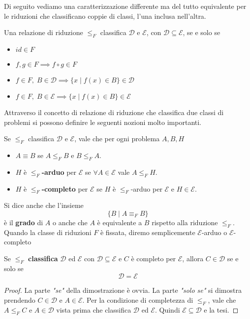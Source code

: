 Di seguito vediamo una caratterizzazione differente ma del tutto
equivalente per le riduzioni che classificano coppie di classi,
l'una inclusa nell'altra.

\begin{lemma}
	Una relazione di riduzione $\leq_F$ classifica $\mathcal{D}$
	e $\mathcal{E}$, con $\mathcal{D} \subseteq \mathcal{E}$, se
	e solo se
	\begin{itemize}
		\item $id \in F$
		\item $f, g \in F \implies f \circ g \in F$
		\item $f \in F, \; B \in \mathcal{D} \implies
			      \{ x \mid f(x) \in B \} \in \mathcal{D}$
		\item $f \in F, \; B \in \mathcal{E} \implies
			      \{ x \mid f(x) \in B \} \in \mathcal{E}$
	\end{itemize}
\end{lemma}

Attraverso il concetto di relazione di riduzione che classifica
due classi di problemi si possono definire le seguenti nozioni
molto importanti.

\begin{definition}
	Se $\leq_F$ classifica $\mathcal{D}$ e $\mathcal{E}$, vale
	che per ogni problema $A, B, H$
	\begin{itemize}
		\item $A \equiv B$ se $A \leq_F B$ e $B \leq_F A$.
		\item $H$ è \textbf{$\leq_F$-arduo} per $\mathcal{E}$ se
		      $\forall A \in \mathcal{E}$ vale $A \leq_F H$.
		\item $H$ è \textbf{$\leq_F$-completo} per $\mathcal{E}$
		      se $H$ è $\leq_F$-arduo per $\mathcal{E}$ e
		      $H \in \mathcal{E}$.
	\end{itemize}
\end{definition}

Si dice anche che l'insieme
\[ \{ B \mid A \equiv_F B \} \]
è il \textbf{grado} di $A$ o anche che $A$ è equivalente a $B$
rispetto alla riduzione $\leq_F$. Quando la classe di riduzioni
$F$ è fissata, diremo semplicemente $\mathcal{E}$-arduo o
$\mathcal{E}$-completo

\begin{property}
	Se $\leq_F$ \textbf{classifica} $\mathcal{D}$ ed $\mathcal{E}$
	con $\mathcal{D} \subseteq \mathcal{E}$ e $C$ è completo per
	$\mathcal{E}$, allora $C \in \mathcal{D}$ se e solo se
	\[ \mathcal{D} = \mathcal{E} \]
	\begin{proof}
		La parte \emph{"se"} della dimostrazione è ovvia. La
		parte \emph{"solo se"} si dimostra prendendo
		$C \in \mathcal{D}$ e $A \in \mathcal{E}$. Per
		la condizione di completezza di $\leq_F$, vale che
		$A \leq_F C$ e $A \in \mathcal{D}$ vista prima che
		classifica $\mathcal{D}$ ed $\mathcal{E}$. Quindi
		$\mathcal{E} \subseteq \mathcal{D}$ e la tesi.
	\end{proof}
\end{property}

